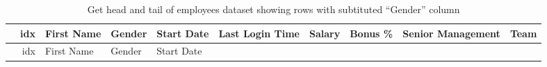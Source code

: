 \documentclass [oneside,10pt,a4paper,ngerman,BCOR10mm,headsepline,parindent,final]{scrartcl}
\begin{document}
    \begin{longtable}[]{@{}rrllllrrll@{}}
\caption{Get head and tail of employees dataset showing rows with
subtituted ``Gender'' column}\tabularnewline
\toprule
\begin{minipage}[b]{0.03\columnwidth}\raggedleft
\strut
\end{minipage} & \begin{minipage}[b]{0.04\columnwidth}\raggedleft
idx\strut
\end{minipage} & \begin{minipage}[b]{0.08\columnwidth}\raggedright
First Name\strut
\end{minipage} & \begin{minipage}[b]{0.06\columnwidth}\raggedright
Gender\strut
\end{minipage} & \begin{minipage}[b]{0.08\columnwidth}\raggedright
Start Date\strut
\end{minipage} & \begin{minipage}[b]{0.10\columnwidth}\raggedright
Last Login Time\strut
\end{minipage} & \begin{minipage}[b]{0.06\columnwidth}\raggedleft
Salary\strut
\end{minipage} & \begin{minipage}[b]{0.06\columnwidth}\raggedleft
Bonus \%\strut
\end{minipage} & \begin{minipage}[b]{0.12\columnwidth}\raggedright
Senior Management\strut
\end{minipage} & \begin{minipage}[b]{0.12\columnwidth}\raggedright
Team\strut
\end{minipage}\tabularnewline
\midrule
\endfirsthead
\toprule
\begin{minipage}[b]{0.03\columnwidth}\raggedleft
\strut
\end{minipage} & \begin{minipage}[b]{0.04\columnwidth}\raggedleft
idx\strut
\end{minipage} & \begin{minipage}[b]{0.08\columnwidth}\raggedright
First Name\strut
\end{minipage} & \begin{minipage}[b]{0.06\columnwidth}\raggedright
Gender\strut
\end{minipage} & \begin{minipage}[b]{0.08\columnwidth}\raggedright
Start Date\strut

\end{minipage}
\end{longtable}
\end{document}
